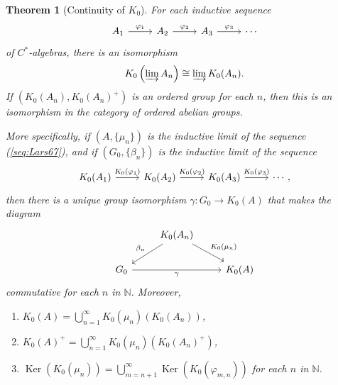 \documentclass{book}
\newtheorem{theorem}[definition]{Theorem}
\def\cstars{\(C^*\)-algebras}
\begin{document}
\begin{theorem}[Continuity of \(K_0\)]
  For each inductive sequence
  \begin{equation}\label{seq:Lars67}
    \begin{tikzcd}
      A_1\arrow[r,"\varphi_1"]&A_2\arrow[r,"\varphi_2"]&A_3\arrow[r,"\varphi_3"]&\cdots
    \end{tikzcd}
  \end{equation}
  of \cstars, there is an isomorphism
  \[
    K_0\left(\varinjlim A_n\right)\cong\varinjlim K_0(A_n).
  \]
  If \((K_0(A_n),K_0(A_n)^+)\) is an ordered group for each \(n\), then this is an
  isomorphism in the category of ordered abelian groups.\par
  More specifically, if \((A,\{\mu_n\})\) is the inductive limit of the sequence (\ref{seq:Lars67}),
  and if \((G_0,\{\beta_n\})\) is the inductive limit of the sequence
  \begin{equation}\label{seq:Lars68}
    \begin{tikzcd}
      K_0(A_1)\arrow[r,"K_0(\varphi_1)"]&K_0(A_2)\arrow[r,"K_0(\varphi_2)"]&K_0(A_3)\arrow[r,"K_0(\varphi_3)"]&\cdots,
    \end{tikzcd}
  \end{equation}
  then there is a unique group isomorphism \(\gamma:G_0\to K_0(A)\) that makes the diagram
  \begin{equation}\label{diag:Lars69}
    \begin{tikzcd}
      &K_0(A_n)\arrow[ld,"\beta_n",swap]\arrow[rd,"K_0(\mu_n)"]&\\
      G_0\arrow[rr,"\gamma",swap]&&K_0(A)
    \end{tikzcd}
  \end{equation}
  commutative for each \(n\) in \(\mathbb{N}\). Moreover,
  \begin{enumerate}
    \item \(K_0(A)=\bigcup_{n=1}^\infty K_0(\mu_n)(K_0(A_n))\),
    \item \(K_0(A)^+=\bigcup_{n=1}^\infty K_0(\mu_n)(K_0(A_n)^+)\),
    \item \(\operatorname{Ker}(K_0(\mu_n))=\bigcup_{m=n+1}^\infty\operatorname{Ker}(K_0(\varphi_{m,n}))\) for each \(n\) in \(\mathbb{N}\).
  \end{enumerate}
\end{theorem}
\end{document}
